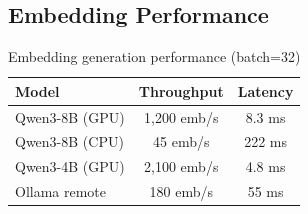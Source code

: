 \subsection{Embedding Performance}

\begin{table}[h]
\centering
\small
\begin{tabular}{|l|c|c|}
\hline
\textbf{Model} & \textbf{Throughput} & \textbf{Latency} \\
\hline
Qwen3-8B (GPU) & 1,200 emb/s & 8.3 ms \\
Qwen3-8B (CPU) & 45 emb/s & 222 ms \\
Qwen3-4B (GPU) & 2,100 emb/s & 4.8 ms \\
Ollama remote & 180 emb/s & 55 ms \\
\hline
\end{tabular}
\caption{Embedding generation performance (batch=32)}
\label{tab:embedding_perf}
\end{table}

